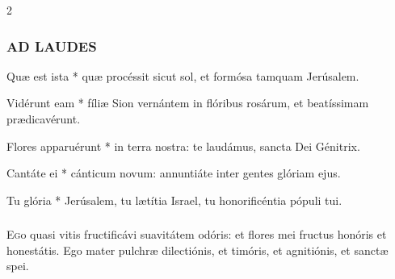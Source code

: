 \documentclass[9pt,twoside]{extarticle}
\begin{document}
\begin{multicols}{2}
\subsubsection*{\center \textsc{AD LAUDES}}
\begin{center}\end{center}
\begin{tightlist}{}
\item {} Quæ est ista * quæ procéssit sicut sol, et formósa tamquam Jerúsalem.
\item {\small {}}
\item {} Vidérunt eam * fíliæ Sion vernántem in flóribus rosárum, et beatíssimam prædicavérunt.
\item {} Flores apparuérunt * in terra nostra: te laudámus, sancta Dei Génitrix.
\item {} Cantáte ei * cánticum novum: annuntiáte inter gentes glóriam ejus.
\item {} Tu glória * Jerúsalem, tu lætítia Israel, tu honorificéntia pópuli tui.
\end{tightlist}

\subsubsection*{\center {}}
\lettrine{E}go quasi vitis fructificávi suavitátem odóris: et flores mei fructus honóris et honestátis. Ego mater pulchræ dilectiónis, et timóris, et agnitiónis, et sanctæ spei.


\end{multicols}
\end{document}

